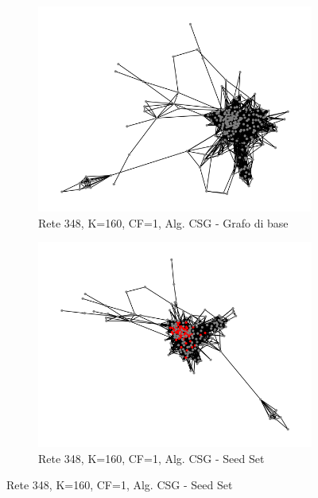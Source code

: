 \newpage

\begin{figure}[h]
  \centering
  \begin{subfigure}[b]{0.3\textwidth}
    \centering
    \includegraphics[width=\textwidth]{images/rete348_alg1_k160_cf1/pre-influencing.png}
    \caption{Rete 348, K=160, CF=1, Alg. CSG - Grafo di base}
    \label{fig:sub1}
  \end{subfigure}
  \hfill
  \begin{subfigure}[b]{0.3\textwidth}
    \centering
    \includegraphics[width=\textwidth]{images/rete348_alg1_k160_cf1/influencing.png}
    \caption{Rete 348, K=160, CF=1, Alg. CSG - Seed Set}
    \label{fig:sub2}
  \end{subfigure}

\end{figure}

